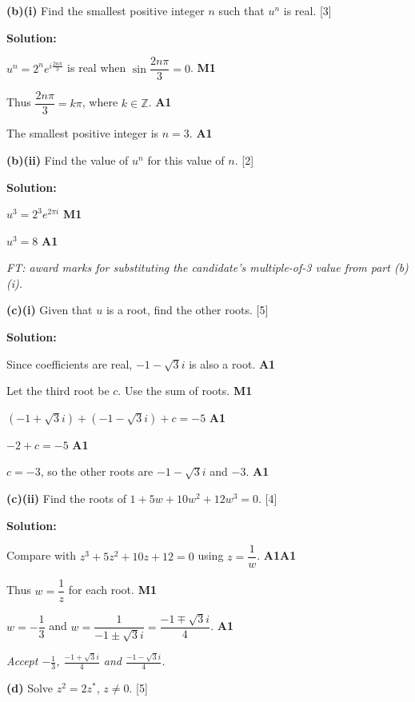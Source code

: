\documentclass[12pt, twoside]{article}
\begin{document}
\begin{enumerate}[itemsep=0.3cm]
\textbf{(b)(i)} Find the smallest positive integer $n$ such that $u^n$ is real. \hfill [3]

\textbf{Solution:}

$u^n = 2^n e^{i\frac{2n\pi}{3}}$ is real when
$\sin\dfrac{2n\pi}{3} = 0$. \hfill \textbf{M1}

Thus $\dfrac{2n\pi}{3} = k\pi$, where $k \in \mathbb{Z}$. \hfill \textbf{A1}

The smallest positive integer is $n = 3$. \hfill \textbf{A1}

\medskip

\textbf{(b)(ii)} Find the value of $u^n$ for this value of $n$. \hfill [2]

\textbf{Solution:}

$u^3 = 2^3e^{2\pi i}$ \hfill \textbf{M1}

$u^3 = 8$ \hfill \textbf{A1}

\emph{FT: award marks for substituting the candidate's multiple-of-3 value from part (b)(i).}

\medskip

\textbf{(c)(i)} Given that $u$ is a root, find the other roots. \hfill [5]

\textbf{Solution:}

Since coefficients are real, $-1 - \sqrt{3}i$ is also a root. \hfill \textbf{A1}

Let the third root be $c$. Use the sum of roots. \hfill \textbf{M1}

$(-1 + \sqrt{3}i) + (-1 - \sqrt{3}i) + c = -5$ \hfill \textbf{A1}

$-2 + c = -5$ \hfill \textbf{A1}

$c = -3$, so the other roots are $-1 - \sqrt{3}i$ and $-3$. \hfill \textbf{A1}

\medskip

\textbf{(c)(ii)} Find the roots of $1 + 5w + 10w^2 + 12w^3 = 0$. \hfill [4]

\textbf{Solution:}

Compare with $z^3 + 5z^2 + 10z + 12 = 0$ using $z = \dfrac{1}{w}$. \hfill \textbf{A1A1}

Thus $w = \dfrac{1}{z}$ for each root. \hfill \textbf{M1}

$w = -\dfrac{1}{3}$ and
$w = \dfrac{1}{-1 \pm \sqrt{3}i} = \dfrac{-1 \mp \sqrt{3}i}{4}$. \hfill \textbf{A1}

\emph{Accept $-\frac13$, $\frac{-1+\sqrt{3}i}{4}$ and $\frac{-1-\sqrt{3}i}{4}$.}

\medskip

\textbf{(d)} Solve $z^2 = 2z^{*}$, $z \neq 0$. \hfill [5]


\end{enumerate}
\end{document}
